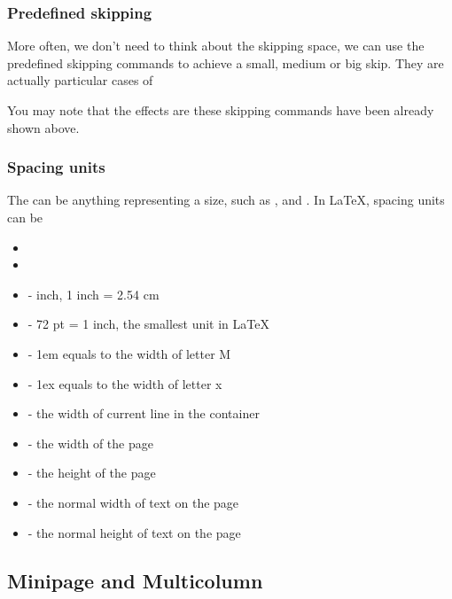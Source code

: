 \begin{frame}[fragile]
	\frametitle{Predefined skipping}

	More often\footnotemark[1], we don't need to think about the skipping space, we can use the predefined skipping commands to achieve a small, medium or big skip. They are actually particular cases of \LC{\vspace}

	\begin{command}
		\LC{\smallskip}\smallskip
		
		\LC{\medskip}\medskip
		
		\LC{\bigskip}\bigskip
	\end{command}

	You may note that the effects are these skipping commands have been already shown above.	
\end{frame}

\begin{frame}
	\frametitle{Spacing units}
	The  can be anything representing a size, such as \structure{1cm}, \structure{2em} and \structure{10pt}. In \LaTeX, spacing units can be
	\begin{itemize}
		\item {}
		\item {}
		\item {} - inch, 1 inch = 2.54 cm
		\item {} - 72 pt = 1 inch, the smallest unit in \LaTeX
		\item {} - 1em equals to the width of letter M
		\item {} - 1ex equals to the width of letter x
		\item \LC{\linewidth} - the width of current line in the container
		\item \LC{\pagewidth} - the width of the page
		\item \LC{\pageheight} - the height of the page
		\item \LC{\textwidth} - the normal width of text on the page
		\item \LC{\textheight} - the normal height of text on the page
	\end{itemize}
\end{frame}

\subsection{Minipage and Multicolumn}

